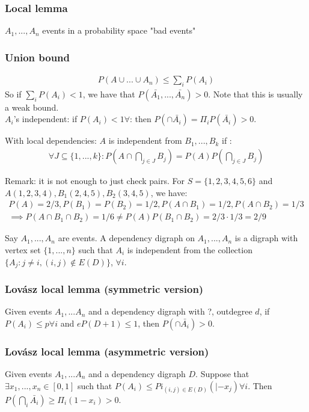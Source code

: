 \documentclass[11pt]{book}
\begin{document}
\subsubsection{Local lemma}
$A_1, ..., A_n$ events in a probability space "bad events"
\subsubsection{Union bound}
\begin{eqnarray}
	P(A \cup ... \cup A_n) \leq \sum_i P(A_i)
\end{eqnarray}
So if $\sum_i P(A_i) < 1$, we have that $P(\bar{A_1}, ..., \bar{A_n}) > 0$. Note that this is usually a weak bound.\\

$A_i$'s independent: if $P(A_i) < 1 \forall$: then $P(\cap \bar{A_i}) = \Pi_i P(\bar{A_i}) > 0$.

With local dependencies: $A$ is independent from $B_1, ..., B_k$ if :
\begin{eqnarray}
	\forall J \subseteq \{1,...,k\} : P(A \cap \bigcap_{j \in J} B_j) = P(A) P(\bigcap_{j \in J}B_j)
\end{eqnarray}

Remark: it is not enough to just check pairs. For $S = \{1,2,3,4,5,6\}$ and $A(1,2,3,4), B_1(2,4,5), B_2(3,4,5)$, we have:
\begin{eqnarray}
	P(A) = 2/3, P(B_1) = P(B_2) = 1/2, P(A \cap B_1) = 1/2, P(A \cap B_2) = 1/3\\
	\implies P(A \cap B_1 \cap B_2) = 1/6 \neq P(A) P(B_1 \cap B_2) = 2/3 \cdot 1/3 = 2/9 
\end{eqnarray}

Say $A_1, ..., A_n$ are events. A dependency digraph on $A_1, ..., A_n$ is a digraph with vertex set $\{ 1, ..., n \}$ such that $A_i$ is independent from the collection $\{ A_j : j \neq i, (i,j) \notin E(D) \}$, $\forall i$.

\subsubsection{Lovász local lemma (symmetric version)}
Given events $A_1,...A_n$ and a dependency digraph with ?, outdegree $d$, if $P(A_i) \leq p \forall i$ and $eP(D+1) \leq 1$, then $P(\cap \bar{A_i}) > 0$.

\subsubsection{Lovász local lemma (asymmetric version)}
Given events $A_1,...A_n$ and a dependency digraph $D$.
Suppose that $\exists x_1, ..., x_n \in [0,1]$ such that $P(A_i) \leq Pi_{(i,j) \in E(D)}( |- x_j) \forall i$. Then $P(\bigcap_i \bar{A_i}) \geq \Pi_i (1 - x_i) > 0$.
\end{document}
